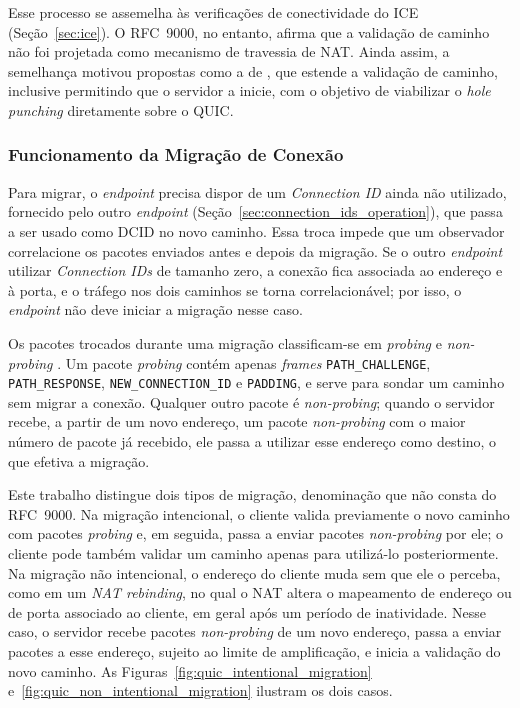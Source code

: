 Esse processo se assemelha às verificações de conectividade do ICE (Seção~\ref{sec:ice}). O RFC~9000, no entanto, afirma que a validação de caminho não foi projetada como mecanismo de travessia de NAT. Ainda assim, a semelhança motivou propostas como a de \citep{draft-seemann-quic-nat-traversal}, que estende a validação de caminho, inclusive permitindo que o servidor a inicie, com o objetivo de viabilizar o \textit{hole punching} diretamente sobre o QUIC.

\subsubsection{Funcionamento da Migração de Conexão}
\label{sec:quic_connection_migration_process}

Para migrar, o \textit{endpoint} precisa dispor de um \textit{Connection ID} ainda não utilizado, fornecido pelo outro \textit{endpoint} (Seção~\ref{sec:connection_ids_operation}), que passa a ser usado como DCID no novo caminho. Essa troca impede que um observador correlacione os pacotes enviados antes e depois da migração. Se o outro \textit{endpoint} utilizar \textit{Connection IDs} de tamanho zero, a conexão fica associada ao endereço e à porta, e o tráfego nos dois caminhos se torna correlacionável; por isso, o \textit{endpoint} não deve iniciar a migração nesse caso.

Os pacotes trocados durante uma migração classificam-se em \textit{probing} e \textit{non-probing} \citep{rfc9000}. Um pacote \textit{probing} contém apenas \textit{frames} \texttt{PATH\_\allowbreak{}CHALLENGE}, \texttt{PATH\_\allowbreak{}RESPONSE}, \texttt{NEW\_\allowbreak{}CONNECTION\_\allowbreak{}ID} e \texttt{PADDING}, e serve para sondar um caminho sem migrar a conexão. Qualquer outro pacote é \textit{non-probing}; quando o servidor recebe, a partir de um novo endereço, um pacote \textit{non-probing} com o maior número de pacote já recebido, ele passa a utilizar esse endereço como destino, o que efetiva a migração.

Este trabalho distingue dois tipos de migração, denominação que não consta do RFC~9000. Na migração intencional, o cliente valida previamente o novo caminho com pacotes \textit{probing} e, em seguida, passa a enviar pacotes \textit{non-probing} por ele; o cliente pode também validar um caminho apenas para utilizá-lo posteriormente. Na migração não intencional, o endereço do cliente muda sem que ele o perceba, como em um \textit{NAT rebinding}, no qual o NAT altera o mapeamento de endereço ou de porta associado ao cliente, em geral após um período de inatividade. Nesse caso, o servidor recebe pacotes \textit{non-probing} de um novo endereço, passa a enviar pacotes a esse endereço, sujeito ao limite de amplificação, e inicia a validação do novo caminho. As Figuras~\ref{fig:quic_intentional_migration} e~\ref{fig:quic_non_intentional_migration} ilustram os dois casos.

